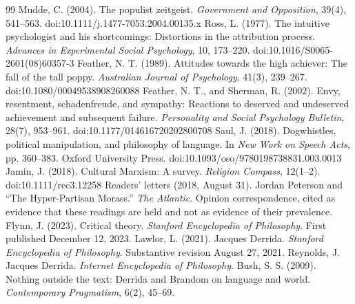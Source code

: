 \documentclass[12pt]{article}
\begin{document}
\begin{thebibliography}{99}
 Mudde, C. (2004). The populist zeitgeist. \emph{Government and Opposition}, 39(4), 541--563. doi:10.1111/j.1477-7053.2004.00135.x
 Ross, L. (1977). The intuitive psychologist and his shortcomings: Distortions in the attribution process. \emph{Advances in Experimental Social Psychology}, 10, 173--220. doi:10.1016/S0065-2601(08)60357-3
 Feather, N. T. (1989). Attitudes towards the high achiever: The fall of the tall poppy. \emph{Australian Journal of Psychology}, 41(3), 239--267. doi:10.1080/00049538908260088
 Feather, N. T., and Sherman, R. (2002). Envy, resentment, schadenfreude, and sympathy: Reactions to deserved and undeserved achievement and subsequent failure. \emph{Personality and Social Psychology Bulletin}, 28(7), 953--961. doi:10.1177/014616720202800708
 Saul, J. (2018). Dogwhistles, political manipulation, and philosophy of language. In \emph{New Work on Speech Acts}, pp. 360--383. Oxford University Press. doi:10.1093/oso/9780198738831.003.0013
 Jamin, J. (2018). Cultural Marxism: A survey. \emph{Religion Compass}, 12(1--2). doi:10.1111/rec3.12258
 Readers' letters (2018, August 31). Jordan Peterson and ``The Hyper-Partisan Morass.'' \emph{The Atlantic}. Opinion correspondence, cited as evidence that these readings are held and not as evidence of their prevalence.
 Flynn, J. (2023). Critical theory. \emph{Stanford Encyclopedia of Philosophy}. First published December 12, 2023.
 Lawlor, L. (2021). Jacques Derrida. \emph{Stanford Encyclopedia of Philosophy}. Substantive revision August 27, 2021.
 Reynolds, J. Jacques Derrida. \emph{Internet Encyclopedia of Philosophy}.
 Bush, S. S. (2009). Nothing outside the text: Derrida and Brandom on language and world. \emph{Contemporary Pragmatism}, 6(2), 45--69.
\end{thebibliography}
\end{document}
